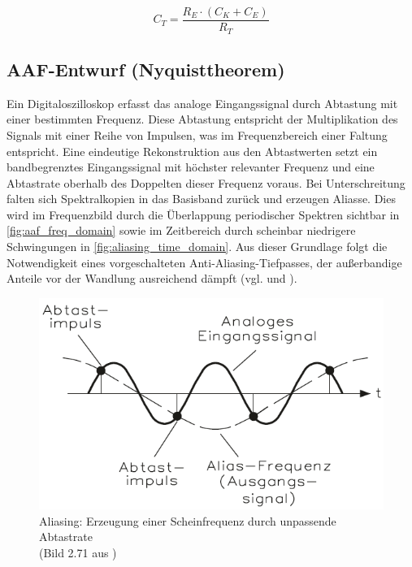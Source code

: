 \documentclass[a4paper, portrait, 12pt]{scrartcl} %
\begin{document}
\begin{equation}
	C_T=\frac{R_E\cdot (C_K+C_E)}{R_T}
	\label{eq:ct_compensated_vdiv}
\end{equation}

\subsection{AAF-Entwurf (Nyquisttheorem)}
\label{subsec:aaf_nyquist}

Ein Digitaloszilloskop erfasst das analoge Eingangssignal durch Abtastung mit einer bestimmten Frequenz. Diese Abtastung entspricht der Multiplikation des Signals mit einer Reihe von Impulsen, was im Frequenzbereich einer Faltung entspricht. Eine eindeutige Rekonstruktion aus den Abtastwerten setzt ein bandbegrenztes Eingangssignal mit höchster relevanter Frequenz und eine Abtastrate oberhalb des Doppelten dieser Frequenz voraus. Bei Unterschreitung falten sich Spektralkopien in das Basisband zurück und erzeugen Aliasse. Dies wird im Frequenzbild durch die Überlappung periodischer Spektren sichtbar in \autoref{fig:aaf_freq_domain} sowie im Zeitbereich durch scheinbar niedrigere Schwingungen in \autoref{fig:aliasing_time_domain}. Aus dieser Grundlage folgt die Notwendigkeit eines vorgeschalteten Anti-Aliasing-Tiefpasses, der außerbandige Anteile vor der Wandlung ausreichend dämpft (vgl. \cite[S. 314-316]{Bernstein2023} und \cite[S. 151-156]{Bernstein2024}).

\begin{figure}[H]
	\centering
		\includegraphics[scale=0.5]{aliasing_time_domain_bernstein.png} 
		\caption{\centering Aliasing: Erzeugung einer Scheinfrequenz durch unpassende Abtastrate\\ (Bild 2.71 aus \cite[S. 154]{Bernstein2024})
		}
	\label{fig:aliasing_time_domain}
\end{figure}
\end{document}
